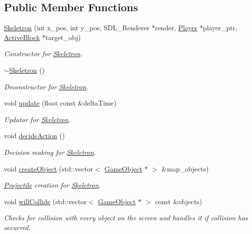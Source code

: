 \subsection*{Public Member Functions}
\begin{DoxyCompactItemize}
\item 
\hyperlink{class_skeletron_acec7ab73ebcaa43fa6699a6b0216144a}{Skeletron} (int x\+\_\+pos, int y\+\_\+pos, S\+D\+L\+\_\+\+Renderer $\ast$render, \hyperlink{class_player}{Player} $\ast$player\+\_\+ptr, \hyperlink{class_active_block}{Active\+Block} $\ast$target\+\_\+obj)
\begin{DoxyCompactList}\small\item\em Constructor for \hyperlink{class_skeletron}{Skeletron}. \end{DoxyCompactList}\item 
\hyperlink{class_skeletron_a38931afc89baf959cfdfbd1d80205f5f}{$\sim$\+Skeletron} ()
\begin{DoxyCompactList}\small\item\em Deconstructor for \hyperlink{class_skeletron}{Skeletron}. \end{DoxyCompactList}\item 
void \hyperlink{class_skeletron_a71229cc19b0069069572564e6ea0083d}{update} (float const \&delta\+Time)
\begin{DoxyCompactList}\small\item\em Updator for \hyperlink{class_skeletron}{Skeletron}. \end{DoxyCompactList}\item 
void \hyperlink{class_skeletron_a624590dc55199a067fda03bc5ef05bc1}{decide\+Action} ()
\begin{DoxyCompactList}\small\item\em Decision making for \hyperlink{class_skeletron}{Skeletron}. \end{DoxyCompactList}\item 
void \hyperlink{class_skeletron_a536f37f0ea61bfb05805226148d683be}{create\+Object} (std\+::vector$<$ \hyperlink{class_game_object}{Game\+Object} $\ast$ $>$ \&map\+\_\+objects)
\begin{DoxyCompactList}\small\item\em \hyperlink{class_projectile}{Projectile} creation for \hyperlink{class_skeletron}{Skeletron}. \end{DoxyCompactList}\item 
void \hyperlink{class_skeletron_a581c47e082d196b8d7d09305404a67e8}{will\+Collide} (std\+::vector$<$ \hyperlink{class_game_object}{Game\+Object} $\ast$ $>$ const \&objects)
\begin{DoxyCompactList}\small\item\em Checks for collision with every object on the screen and handles it if collision has occurred. \end{DoxyCompactList}\end{DoxyCompactItemize}
